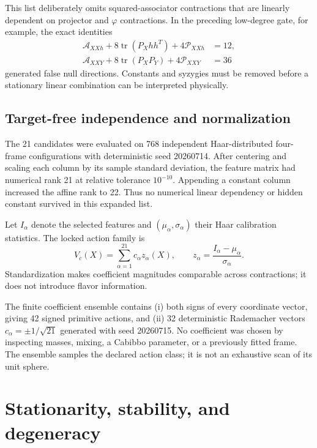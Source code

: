 \documentclass[11pt]{article}
\newcommand{\tr}{\operatorname{tr}}
\begin{document}
This list deliberately omits squared-associator contractions that are linearly dependent on projector and $\varphi$ contractions.  In the preceding low-degree gate, for example, the exact identities
\begin{align}
  \mathcal A_{XXh}+8\tr(P_Xhh^T)+4\mathcal P_{XXh}&=12,\\
  \mathcal A_{XXY}+8\tr(P_XP_Y)+4\mathcal P_{XXY}&=36
\end{align}
generated false null directions.  Constants and syzygies must be removed before a stationary linear combination can be interpreted physically.

\subsection{Target-free independence and normalization}

The 21 candidates were evaluated on 768 independent Haar-distributed four-frame configurations with deterministic seed 20260714.  After centering and scaling each column by its sample standard deviation, the feature matrix had numerical rank 21 at relative tolerance $10^{-10}$.  Appending a constant column increased the affine rank to 22.  Thus no numerical linear dependency or hidden constant survived in this expanded list.

Let $I_\alpha$ denote the selected features and $(\mu_\alpha,\sigma_\alpha)$ their Haar calibration statistics.  The locked action family is
\begin{equation}
  V_c(X)=\sum_{\alpha=1}^{21}c_\alpha z_\alpha(X),
  \qquad
  z_\alpha=\frac{I_\alpha-\mu_\alpha}{\sigma_\alpha}.
  \label{eq:action}
\end{equation}
Standardization makes coefficient magnitudes comparable across contractions; it does not introduce flavor information.

The finite coefficient ensemble contains (i) both signs of every coordinate vector, giving 42 signed primitive actions, and (ii) 32 deterministic Rademacher vectors $c_\alpha=\pm1/\sqrt{21}$ generated with seed 20260715.  No coefficient was chosen by inspecting masses, mixing, a Cabibbo parameter, or a previously fitted frame.  The ensemble samples the declared action class; it is not an exhaustive scan of its unit sphere.

\section{Stationarity, stability, and degeneracy}
\end{document}
